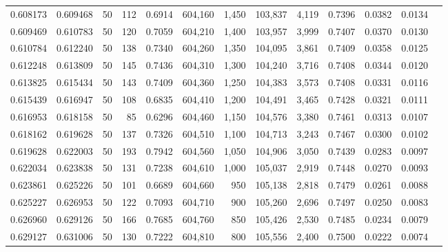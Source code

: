 \begin{tabular}{rrrrrrrrrrrrr}
0.608173 & 0.609468 &    50 & 112 &                                     0.6914 & 604,160 &   1,450 & 103,837 &   4,119 & 0.7396 & 0.0382 & 0.0134 \\
0.609469 & 0.610783 &    50 & 120 &                                     0.7059 & 604,210 &   1,400 & 103,957 &   3,999 & 0.7407 & 0.0370 & 0.0130 \\
0.610784 & 0.612240 &    50 & 138 &                                     0.7340 & 604,260 &   1,350 & 104,095 &   3,861 & 0.7409 & 0.0358 & 0.0125 \\
0.612248 & 0.613809 &    50 & 145 &                                     0.7436 & 604,310 &   1,300 & 104,240 &   3,716 & 0.7408 & 0.0344 & 0.0120 \\
0.613825 & 0.615434 &    50 & 143 &                                     0.7409 & 604,360 &   1,250 & 104,383 &   3,573 & 0.7408 & 0.0331 & 0.0116 \\
0.615439 & 0.616947 &    50 & 108 &                                     0.6835 & 604,410 &   1,200 & 104,491 &   3,465 & 0.7428 & 0.0321 & 0.0111 \\
0.616953 & 0.618158 &    50 &  85 &                                     0.6296 & 604,460 &   1,150 & 104,576 &   3,380 & 0.7461 & 0.0313 & 0.0107 \\
0.618162 & 0.619628 &    50 & 137 &                                     0.7326 & 604,510 &   1,100 & 104,713 &   3,243 & 0.7467 & 0.0300 & 0.0102 \\
0.619628 & 0.622003 &    50 & 193 &                                     0.7942 & 604,560 &   1,050 & 104,906 &   3,050 & 0.7439 & 0.0283 & 0.0097 \\
0.622034 & 0.623838 &    50 & 131 &                                     0.7238 & 604,610 &   1,000 & 105,037 &   2,919 & 0.7448 & 0.0270 & 0.0093 \\
0.623861 & 0.625226 &    50 & 101 &                                     0.6689 & 604,660 &     950 & 105,138 &   2,818 & 0.7479 & 0.0261 & 0.0088 \\
0.625227 & 0.626953 &    50 & 122 &                                     0.7093 & 604,710 &     900 & 105,260 &   2,696 & 0.7497 & 0.0250 & 0.0083 \\
0.626960 & 0.629126 &    50 & 166 &                                     0.7685 & 604,760 &     850 & 105,426 &   2,530 & 0.7485 & 0.0234 & 0.0079 \\
0.629127 & 0.631006 &    50 & 130 &                                     0.7222 & 604,810 &     800 & 105,556 &   2,400 & 0.7500 & 0.0222 & 0.0074 \\

\end{tabular}
